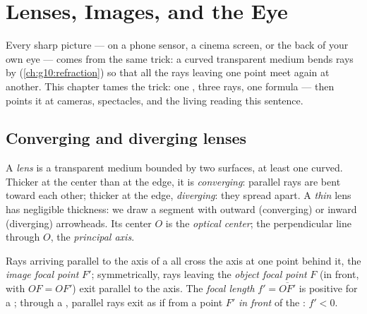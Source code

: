 \chapter{Lenses, Images, and the Eye}\label{ch:g11:lenses-and-eye}

Every sharp picture --- on a phone sensor, a cinema screen, or the back
of your own eye --- comes from the same trick: a curved transparent
medium bends rays by  (\cref{ch:g10:refraction}) so that all
the rays leaving one point meet again at another. This chapter tames
the trick: one , three rays, one formula --- then points it at
cameras, spectacles, and the living  reading this sentence.

\section{Converging and diverging lenses}

\begin{definition}\label{def:g11:lenses-and-eye:lens}
A \emph{lens} is a transparent medium bounded by two
surfaces, at least one curved. Thicker at the center than at the edge,
it is \emph{converging}: parallel rays are bent
toward each other; thicker at the edge, \emph{diverging}: they spread apart. A \emph{thin} lens has
negligible thickness: we draw a segment with outward (converging) or
inward (diverging) arrowheads. Its center $O$ is the \emph{optical
center}; the perpendicular line through $O$, the
\emph{principal axis}.
\end{definition}

\begin{definition}\label{def:g11:lenses-and-eye:focal}
Rays arriving parallel to the axis of a  all cross the
axis at one point behind it, the \emph{image focal point} $F'$; symmetrically, rays leaving the \emph{object focal point}
$F$ (in front, with $OF = OF'$) exit parallel to the axis. The
\emph{focal length} $f' = \overline{OF'}$ is
positive for a ; through a , parallel rays
exit as if from a point $F'$ \emph{in front} of the : $f' < 0$.
\end{definition}

